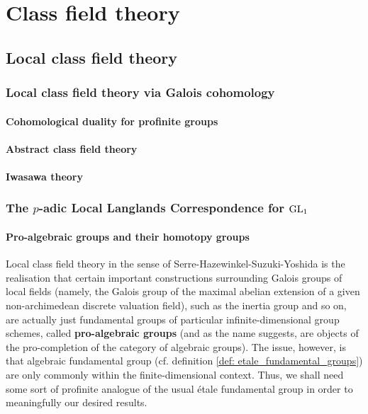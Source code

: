 \chapter{Class field theory}
    \begin{abstract}
        
    \end{abstract}
    
    \minitoc
    
    \section{Local class field theory}
        \subsection{Local class field theory via Galois cohomology}
            \subsubsection{Cohomological duality for profinite groups}
            
            \subsubsection{Abstract class field theory}
            
            \subsubsection{Iwasawa theory}
    
        \subsection{The \texorpdfstring{$p$}{}-adic Local Langlands Correspondence for \texorpdfstring{$\operatorname{GL}_1$}{}}
            \subsubsection{Pro-algebraic groups and their homotopy groups}
                Local class field theory in the sense of Serre-Hazewinkel-Suzuki-Yoshida is the realisation that certain important constructions surrounding Galois groups of local fields (namely, the Galois group of the maximal abelian extension of a given non-archimedean discrete valuation field), such as the inertia group and so on, are actually just fundamental groups of particular infinite-dimensional group schemes, called \textbf{pro-algebraic groups} (and as the name suggests, are objects of the pro-completion of the category of algebraic groups). The issue, however, is that algebraic fundamental group (cf. definition \ref{def: etale_fundamental_groups}) are only commonly within the finite-dimensional context. Thus, we shall need some sort of profinite analogue of the usual \'etale fundamental group in order to meaningfully our desired results.
                
